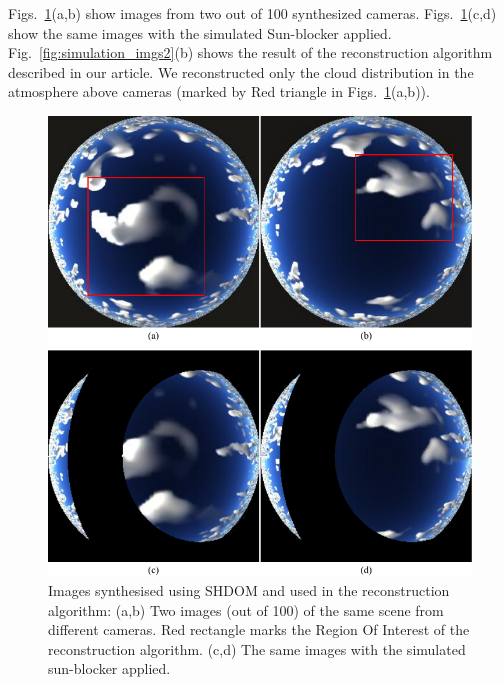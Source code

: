 \documentclass[runningheads]{llncs}
\begin{document}
Figs.~\ref{fig:simulation_imgs1}(a,b) show images from two out of 100
synthesized cameras. Figs.~\ref{fig:simulation_imgs1}(c,d) show the
same images with the simulated Sun-blocker applied.
Fig.~\ref{fig:simulation_imgs2}(b) shows the result of the
reconstruction algorithm described in our article. We reconstructed
only the cloud distribution in the atmosphere above cameras (marked by
Red triangle in Figs.~\ref{fig:simulation_imgs1}(a,b)).
\begin{figure}
  \begin{center}
    \includegraphics{figures/simulation_imgs}
    \caption{Images synthesised using SHDOM and used in the
      reconstruction algorithm: (a,b) Two images (out of 100) of the
      same scene from different cameras. Red rectangle marks the
      Region Of Interest of the reconstruction algorithm. (c,d) The
      same images with the simulated sun-blocker applied.}
    \label{fig:simulation_imgs1}
  \end{center}
\end{figure}
\end{document}
